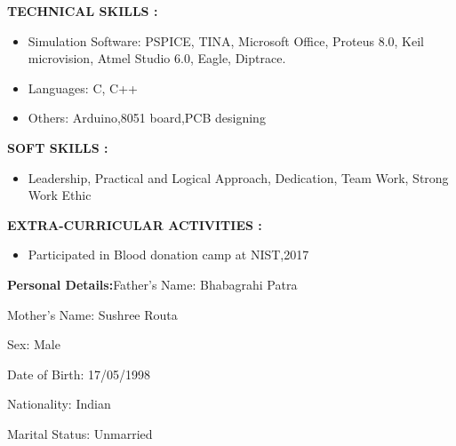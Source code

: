 \documentclass[a4]{article}
\begin{document}
\vspace{3mm}
\textbf{TECHNICAL SKILLS : } 
\begin{itemize}
	\item Simulation Software: PSPICE, TINA, Microsoft Office, Proteus 8.0, Keil microvision, Atmel Studio 6.0, Eagle, Diptrace.
	\item Languages: C, C++
        \item Others: Arduino,8051 board,PCB designing

\end{itemize}

\vspace{3mm}
\textbf{SOFT SKILLS : } 
\begin{itemize}
	\item  Leadership,  Practical  and Logical Approach, Dedication, Team Work, Strong Work Ethic

\end{itemize}

\vspace{3mm}
\textbf{EXTRA-CURRICULAR ACTIVITIES : } 
\begin{itemize}
	\item Participated in Blood donation camp at NIST,2017
\end{itemize}

\vspace{3mm}
\textbf{Personal Details:}\hspace{.4cm}Father's Name: Bhabagrahi Patra

\hspace{3.4cm}Mother's Name: Sushree Routa

\hspace{3.4cm}Sex: Male

\hspace{3.4cm}Date of Birth: 17/05/1998

\hspace{3.4cm}Nationality: Indian

\hspace{3.4cm}Marital Status: Unmarried
\end{document}
